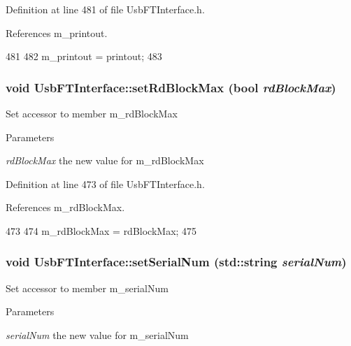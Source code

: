 Definition at line 481 of file UsbFTInterface.h.

References m\_\-printout.


\begin{DoxyCode}
481                                    {
482     m_printout = printout;
483   }
\end{DoxyCode}
\hypertarget{classUsbFTInterface_a63615ac245f36dc6a298228d8dcd31c4}{
\subsubsection[{setRdBlockMax}]{\setlength{\rightskip}{0pt plus 5cm}void UsbFTInterface::setRdBlockMax (bool {\em rdBlockMax})}}
\label{classUsbFTInterface_a63615ac245f36dc6a298228d8dcd31c4}
Set accessor to member m\_\-rdBlockMax 
\begin{DoxyParams}{Parameters}
\item[{\em rdBlockMax}]the new value for m\_\-rdBlockMax \end{DoxyParams}


Definition at line 473 of file UsbFTInterface.h.

References m\_\-rdBlockMax.


\begin{DoxyCode}
473                                        {
474     m_rdBlockMax = rdBlockMax;
475   }
\end{DoxyCode}
\hypertarget{classUsbFTInterface_aaabe44c3b717a98e7571de296085c3a4}{
\subsubsection[{setSerialNum}]{\setlength{\rightskip}{0pt plus 5cm}void UsbFTInterface::setSerialNum (std::string {\em serialNum})}}
\label{classUsbFTInterface_aaabe44c3b717a98e7571de296085c3a4}
Set accessor to member m\_\-serialNum 
\begin{DoxyParams}{Parameters}
\item[{\em serialNum}]the new value for m\_\-serialNum \end{DoxyParams}


